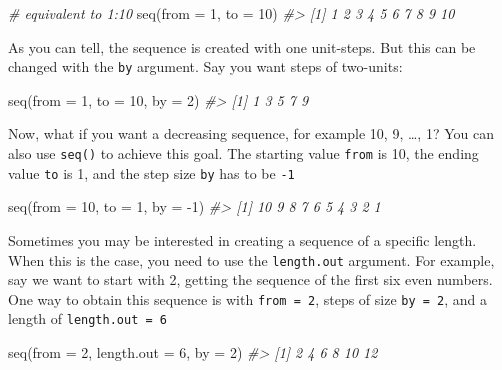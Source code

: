 \documentclass[
]{book}
\newenvironment{Shaded}{\begin{snugshade}}{\end{snugshade}}
\newcommand{\AttributeTok}[1]{\textcolor[rgb]{0.77,0.63,0.00}{#1}}
\newcommand{\CommentTok}[1]{\textcolor[rgb]{0.56,0.35,0.01}{\textit{#1}}}
\newcommand{\DecValTok}[1]{\textcolor[rgb]{0.00,0.00,0.81}{#1}}
\newcommand{\FunctionTok}[1]{\textcolor[rgb]{0.00,0.00,0.00}{#1}}
\newcommand{\NormalTok}[1]{#1}
\newcommand{\SpecialCharTok}[1]{\textcolor[rgb]{0.00,0.00,0.00}{#1}}
\begin{document}
\begin{Shaded}
\begin{Highlighting}[]
\CommentTok{\# equivalent to 1:10}
\FunctionTok{seq}\NormalTok{(}\AttributeTok{from =} \DecValTok{1}\NormalTok{, }\AttributeTok{to =} \DecValTok{10}\NormalTok{)}
\CommentTok{\#\textgreater{}  [1]  1  2  3  4  5  6  7  8  9 10}
\end{Highlighting}
\end{Shaded}

As you can tell, the sequence is created with one unit-steps. But this can
be changed with the \texttt{by} argument. Say you want steps of two-units:

\begin{Shaded}
\begin{Highlighting}[]
\FunctionTok{seq}\NormalTok{(}\AttributeTok{from =} \DecValTok{1}\NormalTok{, }\AttributeTok{to =} \DecValTok{10}\NormalTok{, }\AttributeTok{by =} \DecValTok{2}\NormalTok{)}
\CommentTok{\#\textgreater{} [1] 1 3 5 7 9}
\end{Highlighting}
\end{Shaded}

Now, what if you want a decreasing sequence, for example 10, 9, \ldots, 1?
You can also use \texttt{seq()} to achieve this goal. The starting value \texttt{from} is 10,
the ending value \texttt{to} is 1, and the step size \texttt{by} has to be \texttt{-1}

\begin{Shaded}
\begin{Highlighting}[]
\FunctionTok{seq}\NormalTok{(}\AttributeTok{from =} \DecValTok{10}\NormalTok{, }\AttributeTok{to =} \DecValTok{1}\NormalTok{, }\AttributeTok{by =} \SpecialCharTok{{-}}\DecValTok{1}\NormalTok{)}
\CommentTok{\#\textgreater{}  [1] 10  9  8  7  6  5  4  3  2  1}
\end{Highlighting}
\end{Shaded}

Sometimes you may be interested in creating a sequence of a specific length.
When this is the case, you need to use the \texttt{length.out} argument. For example,
say we want to start with 2, getting the sequence of the first six even numbers.
One way to obtain this sequence is with \texttt{from\ =\ 2}, steps of size \texttt{by\ =\ 2},
and a length of \texttt{length.out\ =\ 6}

\begin{Shaded}
\begin{Highlighting}[]
\FunctionTok{seq}\NormalTok{(}\AttributeTok{from =} \DecValTok{2}\NormalTok{, }\AttributeTok{length.out =} \DecValTok{6}\NormalTok{, }\AttributeTok{by =} \DecValTok{2}\NormalTok{)}
\CommentTok{\#\textgreater{} [1]  2  4  6  8 10 12}
\end{Highlighting}
\end{Shaded}
\end{document}
